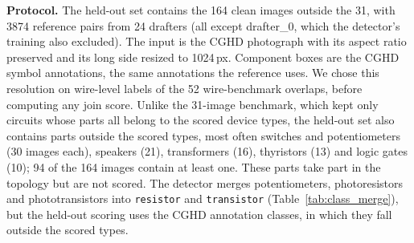 \documentclass[journal]{IEEEtran}
\begin{document}
\textbf{Protocol.} The held-out set contains the 164 clean images outside the 31, with 3874 reference pairs from 24 drafters (all except drafter\_0, which the detector's training also excluded). The input is the CGHD photograph with its aspect ratio preserved and its long side resized to 1024\,px. Component boxes are the CGHD symbol annotations, the same annotations the reference uses. We chose this resolution on wire-level labels of the 52 wire-benchmark overlaps, before computing any join score. Unlike the 31-image benchmark, which kept only circuits whose parts all belong to the scored device types, the held-out set also contains parts outside the scored types, most often switches and potentiometers (30 images each), speakers (21), transformers (16), thyristors (13) and logic gates (10); 94 of the 164 images contain at least one. These parts take part in the topology but are not scored. The detector merges potentiometers, photoresistors and phototransistors into \texttt{resistor} and \texttt{transistor} (Table~\ref{tab:class_merge}), but the held-out scoring uses the CGHD annotation classes, in which they fall outside the scored types.

\begin{table}[t]
\caption{Independent held-out benchmark (164 CGHD photographs, 24 drafters, 3874 reference pairs; annotated component boxes). {$\Delta$} is ours minus the comparator in micro-F1, with 95\% paired bootstrap CI. Every difference has Holm-adjusted $p=0.0006$, the resolution floor of the tests.}
\label{tab:cghd_ref}
\centering
\footnotesize
\setlength{\tabcolsep}{2.5pt}
\end{table}
\end{document}
